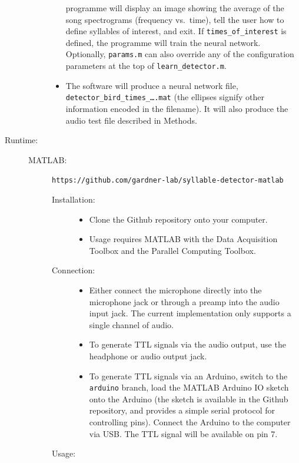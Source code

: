 \documentclass[10pt,letterpaper]{article}
\begin{document}
\begin{description}
\begin{description}
\begin{itemize}
      programme will display an image showing the average of the song
      spectrograms (frequency vs.~time), tell the user how to define
      syllables of interest, and exit.  If {\tt times\_of\_interest}
      is defined, the programme will train the neural network.
      Optionally, {\tt params.m} can also override any of the
      configuration parameters at the top of {\tt learn\_detector.m}.
    \item The software will produce a neural network file, {\tt
      detector\_bird\_times\_\dots.mat} (the ellipses signify other
      information encoded in the filename).  It will also produce the
      audio test file described in Methods.
    \end{itemize}
  \end{description}
  
\item[Runtime:]\hfill
  \begin{description}
  \item[MATLAB:] {\tt https://github.com/gardner-lab/syllable-detector-matlab}
    \begin{description}
    \item[Installation:]\hfill
      \begin{itemize}
      \item Clone the Github repository onto your computer.
      \item Usage requires MATLAB with the Data Acquisition Toolbox and the 
      Parallel Computing Toolbox.
      \end{itemize}
    \item[Connection:]\hfill
      \begin{itemize}
      \item Either connect the microphone directly into the microphone jack or through a 
      preamp into the audio input jack. The current implementation only supports a single 
      channel of audio.
      \item To generate TTL signals via the audio output, use the headphone or audio output
      jack.
      \item To generate TTL signals via an Arduino, switch to the {\tt arduino} branch, 
      load the MATLAB Arduino IO sketch onto the Arduino (the sketch is available in the 
      Github repository, and provides a simple serial protocol for controlling pins). 
      Connect the Arduino to the computer via USB. The TTL signal will be available on
      pin 7.
      \end{itemize}
    \item[Usage:]\hfill

\end{description}
\end{description}
\end{description}
\end{document}
